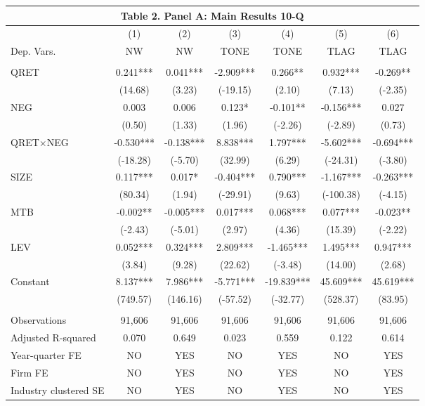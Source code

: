 \begin{table}[htbp] \label{T2PA}
  \centering
    \begin{tabular}{lcccccc}
    \multicolumn{7}{c}{\textbf{Table 2. Panel A: Main Results 10-Q}} \\
    \midrule
      & (1) & (2) & (3) & (4) & (5) & (6) \\
    Dep. Vars. & NW & NW & TONE & TONE & TLAG & TLAG \\
    \midrule
      &   &   &   &   &   &  \\
    QRET & 0.241*** & 0.041*** & -2.909*** & 0.266** & 0.932*** & -0.269** \\
      & (14.68) & (3.23) & (-19.15) & (2.10) & (7.13) & (-2.35) \\
    NEG & 0.003 & 0.006 & 0.123* & -0.101** & -0.156*** & 0.027 \\
      & (0.50) & (1.33) & (1.96) & (-2.26) & (-2.89) & (0.73) \\
    \rowcolor[rgb]{ .933,  .925,  .882} QRET$\times$NEG & -0.530*** & -0.138*** & 8.838*** & 1.797*** & -5.602*** & -0.694*** \\
    \rowcolor[rgb]{ .933,  .925,  .882}   & (-18.28) & (-5.70) & (32.99) & (6.29) & (-24.31) & (-3.80) \\
    SIZE & 0.117*** & 0.017* & -0.404*** & 0.790*** & -1.167*** & -0.263*** \\
      & (80.34) & (1.94) & (-29.91) & (9.63) & (-100.38) & (-4.15) \\
    MTB & -0.002** & -0.005*** & 0.017*** & 0.068*** & 0.077*** & -0.023** \\
      & (-2.43) & (-5.01) & (2.97) & (4.36) & (15.39) & (-2.22) \\
    LEV & 0.052*** & 0.324*** & 2.809*** & -1.465*** & 1.495*** & 0.947*** \\
      & (3.84) & (9.28) & (22.62) & (-3.48) & (14.00) & (2.68) \\
    Constant & 8.137*** & 7.986*** & -5.771*** & -19.839*** & 45.609*** & 45.619*** \\
      & (749.57) & (146.16) & (-57.52) & (-32.77) & (528.37) & (83.95) \\
      &   &   &   &   &   &  \\
    Observations & 91,606 & 91,606 & 91,606 & 91,606 & 91,606 & 91,606 \\
    Adjusted R-squared & 0.070 & 0.649 & 0.023 & 0.559 & 0.122 & 0.614 \\
    Year-quarter FE & NO & YES & NO & YES & NO & YES \\
    Firm FE & NO & YES & NO & YES & NO & YES \\
    Industry clustered SE & NO & YES & NO & YES & NO & YES \\
    \bottomrule
    \end{tabular}%
\end{table}%
